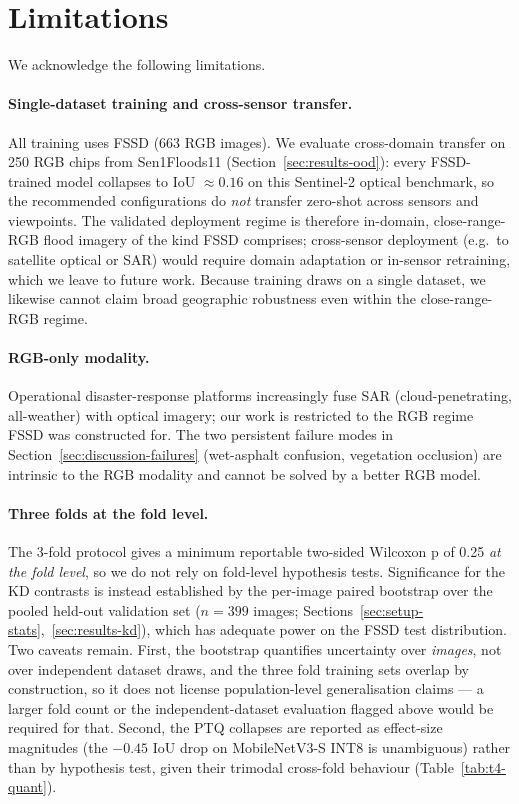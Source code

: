 
\section{Limitations}
\label{sec:limitations}

We acknowledge the following limitations.

\paragraph{Single-dataset training and cross-sensor transfer.} All training uses FSSD (663 RGB images). We evaluate cross-domain transfer on 250 RGB chips from Sen1Floods11 (Section~\ref{sec:results-ood}): every FSSD-trained model collapses to IoU $\approx 0.16$ on this Sentinel-2 optical benchmark, so the recommended configurations do \emph{not} transfer zero-shot across sensors and viewpoints. The validated deployment regime is therefore in-domain, close-range-RGB flood imagery of the kind FSSD comprises; cross-sensor deployment (e.g.\ to satellite optical or SAR) would require domain adaptation or in-sensor retraining, which we leave to future work. Because training draws on a single dataset, we likewise cannot claim broad geographic robustness even within the close-range-RGB regime.

\paragraph{RGB-only modality.} Operational disaster-response platforms increasingly fuse SAR (cloud-penetrating, all-weather) with optical imagery; our work is restricted to the RGB regime FSSD was constructed for. The two persistent failure modes in Section~\ref{sec:discussion-failures} (wet-asphalt confusion, vegetation occlusion) are intrinsic to the RGB modality and cannot be solved by a better RGB model.

\paragraph{Three folds at the fold level.} The 3-fold protocol gives a minimum reportable two-sided Wilcoxon p of 0.25 \emph{at the fold level}, so we do not rely on fold-level hypothesis tests. Significance for the KD contrasts is instead established by the per-image paired bootstrap over the pooled held-out validation set ($n=399$ images; Sections~\ref{sec:setup-stats},~\ref{sec:results-kd}), which has adequate power on the FSSD test distribution. Two caveats remain. First, the bootstrap quantifies uncertainty over \emph{images}, not over independent dataset draws, and the three fold training sets overlap by construction, so it does not license population-level generalisation claims --- a larger fold count or the independent-dataset evaluation flagged above would be required for that. Second, the PTQ collapses are reported as effect-size magnitudes (\eg the $-0.45$ IoU drop on MobileNetV3-S INT8 is unambiguous) rather than by hypothesis test, given their trimodal cross-fold behaviour (Table~\ref{tab:t4-quant}).

